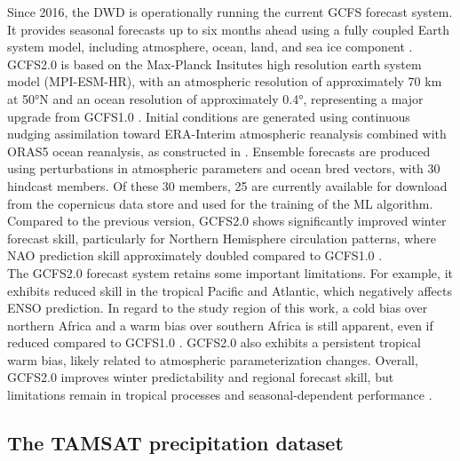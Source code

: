 \documentclass[ba-lentz.tex]{subfile}
\begin{document}
Since 2016, the DWD is operationally running the current GCFS forecast system.
It provides seasonal forecasts up to six months ahead using a fully coupled Earth system model, including atmosphere, ocean, land, and sea ice component \parencite{frohlich_german_2021}.
GCFS2.0 is based on the Max-Planck Insitutes high resolution earth system model (MPI-ESM-HR), with an atmospheric resolution of approximately 70 km at 50°N and an ocean resolution of approximately 0.4°, representing a major upgrade from GCFS1.0 \parencite{frohlich_german_2021}.
Initial conditions are generated using continuous nudging assimilation toward ERA-Interim atmospheric reanalysis combined with ORAS5 ocean reanalysis, as constructed in \cite{baehr_prediction_2015}.
Ensemble forecasts are produced using perturbations in atmospheric parameters and ocean bred vectors, with 30 hindcast members.
Of these 30 members, 25 are currently available for download from the copernicus data store and used for the training of the ML algorithm.
Compared to the previous version, GCFS2.0 shows significantly improved winter forecast skill, particularly for Northern Hemisphere circulation patterns, where NAO prediction skill approximately doubled compared to GCFS1.0 \parencite{frohlich_german_2021}. \\
The GCFS2.0 forecast system retains some important limitations.
For example, it exhibits reduced skill in the tropical Pacific and Atlantic, which negatively affects ENSO prediction.
In regard to the study region of this work, a cold bias over northern Africa and a warm bias over southern Africa is still apparent, even if reduced compared to GCFS1.0 \parencite{frohlich_german_2021}.
GCFS2.0 also exhibits a persistent tropical warm bias, likely related to atmospheric parameterization changes.
Overall, GCFS2.0 improves winter predictability and regional forecast skill, but limitations remain in tropical processes and seasonal-dependent performance \parencite{frohlich_german_2021}.

\subsection*{The TAMSAT precipitation dataset}\label{tamsat}
\end{document}
